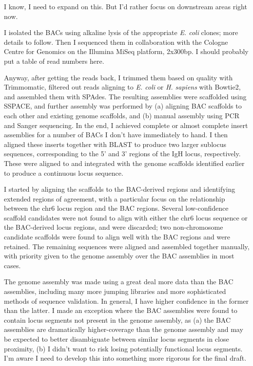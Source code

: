 I know, I need to expand on this. But I'd rather focus on downstream areas right now.


I isolated the BACs using alkaline lysis of the appropriate \textit{E. coli} clones; more details to follow. Then I sequenced them in collaboration with the Cologne Centre for Genomics on the Illumina MiSeq platform, 2x300bp. I should probably put a table of read numbers here.

Anyway, after getting the reads back, I trimmed them based on quality with Trimmomatic, filtered out reads aligning to \textit{E. coli} or \textit{H. sapiens} with Bowtie2, and assembled them with SPAdes. The resulting assemblies were scaffolded using SSPACE, and further assembly was performed by (a) aligning BAC scaffolds to each other and existing genome scaffolds, and (b) manual assembly using PCR and Sanger sequencing. In the end, I achieved complete or almost complete insert assemblies for a number of BACs I don't have immediately to hand. I then aligned these inserts together with BLAST to produce two larger sublocus sequences, corresponding to the 5' and 3' regions of the IgH locus, respectively. These were aligned to and integrated with the genome scaffolds identified earlier to produce a continuous locus sequence. 


I started by aligning the scaffolds to the BAC-derived regions and identifying extended regions of agreement, with a particular focus on the relationship between the chr6 locus region and the BAC regions. Several low-confidence scaffold candidates were not found to align with either the chr6 locus sequence or the BAC-derived locus regions, and were discarded; two non-chromosome candidate scaffolds were found to align well with the BAC regions and were retained. The remaining sequences were aligned and assembled together manually, with priority given to the genome assembly over the BAC assemblies in most cases.


The genome assembly was made using a great deal more data than the BAC assemblies, including many more jumping libraries and more sophisticated methods of sequence validation. In general, I have higher confidence in the former than the latter. I made an exception where the BAC assemblies were found to contain locus segments not present in the genome assembly, as (a) the BAC assemblies are dramatically higher-coverage than the genome assembly and may be expected to better disambiguate between similar locus segments in close proximity, (b) I didn't want to risk losing potentially functional locus segments. I'm aware I need to develop this into something more rigorous for the final draft.

